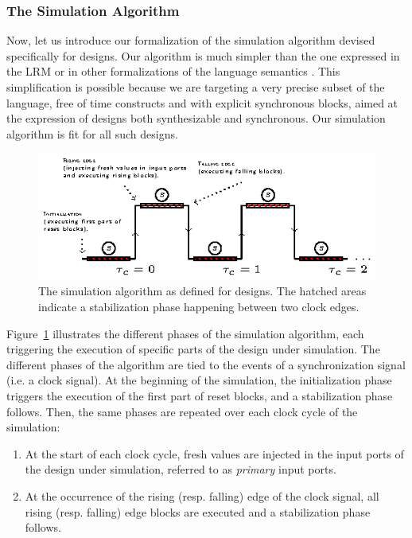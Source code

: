 \documentclass[pdflatex,sn-mathphys]{sn-jnl}%
\theoremstyle{thmstyleone}%
\theoremstyle{thmstyletwo}%
\theoremstyle{thmstylethree}%
\begin{document}
\subsubsection{The Simulation Algorithm}
\label{subsubsec:sim-algo}

Now, let us introduce our formalization of the simulation algorithm
devised specifically for \hvhdl{} designs. Our algorithm is much
simpler than the one expressed in the \vhdl{} LRM \cite{VHDL2000} or in
other formalizations of the \vhdl{} language
semantics \cite{Borger1995}. This simplification is possible because we
are targeting a very precise subset of the language, free of time
constructs and with explicit synchronous blocks, aimed at the
expression of designs both synthesizable and synchronous. Our
simulation algorithm is fit for all such designs.

\begin{figure}[h]
  \centering
  \includegraphics[keepaspectratio,width=\textwidth]{sim-alg.eps}
  \caption{The simulation algorithm as defined for \hvhdl{}
    designs. The hatched areas indicate a stabilization phase
    happening between two clock edges. }
  \label{fig:sim-alg}
\end{figure}

Figure~\ref{fig:sim-alg} illustrates the different phases of the
\hvhdl{} simulation algorithm, each triggering the execution of
specific parts of the design under simulation. The different phases of
the algorithm are tied to the events of a synchronization signal
(i.e. a clock signal). At the beginning of the simulation, the
initialization phase triggers the execution of the first part of reset
blocks, and a stabilization phase follows. Then, the same phases are
repeated over each clock cycle of the simulation:

\begin{enumerate}
\item At the start of each clock cycle, fresh values are injected in
  the input ports of the design under simulation, referred to as
  \textit{primary} input ports.
\item At the occurrence of the rising (resp. falling) edge of the
  clock signal, all rising (resp. falling) edge blocks are executed
  and a stabilization phase follows.  
\end{enumerate}
\end{document}
